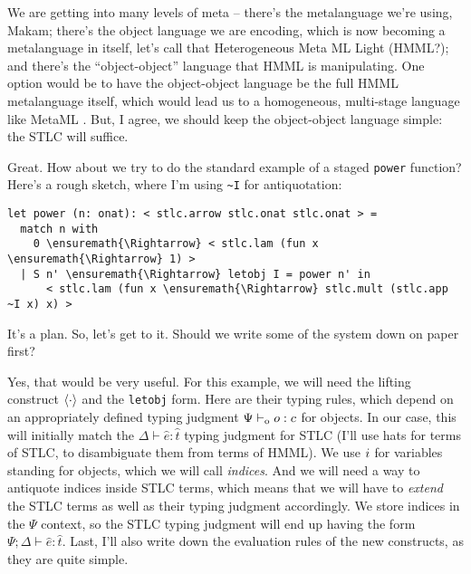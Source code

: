 \heroADVISOR{} We are getting into many levels of meta -- there's the
metalanguage we're using, Makam; there's the object language we are
encoding, which is now becoming a metalanguage in itself, let's call
that Heterogeneous Meta ML Light (HMML?); and there's the
``object-object'' language that HMML is manipulating. One option would
be to have the object-object language be the full HMML metalanguage
itself, which would lead us to a homogeneous, multi-stage language like
MetaML \citep{metaml-main-reference}. But, I agree, we should keep the
object-object language simple: the STLC will suffice.

\heroSTUDENT{} Great. How about we try to do the standard example of a staged
\texttt{power} function? Here's a rough sketch, where I'm using
\texttt{\textasciitilde{}I} for antiquotation:

\begin{verbatim}
let power (n: onat): < stlc.arrow stlc.onat stlc.onat > =
  match n with
    0 \ensuremath{\Rightarrow} < stlc.lam (fun x \ensuremath{\Rightarrow} 1) >
  | S n' \ensuremath{\Rightarrow} letobj I = power n' in
      < stlc.lam (fun x \ensuremath{\Rightarrow} stlc.mult (stlc.app ~I x) x) >
\end{verbatim}

\heroADVISOR{} It's a plan. So, let's get to it. Should we write some of the
system down on paper first?

\heroSTUDENT{} Yes, that would be very useful. For this example, we will need
the lifting construct \(\langle\cdot\rangle\) and the \texttt{letobj} form.
Here are their typing rules, which depend on an appropriately defined
typing judgment \(\Psi \vdash_{\text{o}} o : c\) for objects. In our case, this
will initially match the \(\Delta \vdash \hat{e} : \hat{t}\) typing
judgment for STLC (I'll use hats for terms of STLC, to disambiguate them
from terms of HMML). We use \(i\) for variables standing for
objects, which we will call \emph{indices}. And we will need a way to
antiquote indices inside STLC terms, which means that we will have to
\emph{extend} the STLC terms as well as their typing judgment
accordingly. We store indices in the \(\Psi\) context, so the STLC
typing judgment will end up having the form
\(\Psi; \Delta \vdash \hat{e} : \hat{t}\). Last, I'll also write down
the evaluation rules of the new constructs, as they are quite simple.

\newcommand\stlce[0]{\hat{e}}
\newcommand\stlct[0]{\hat{t}}
\newcommand\stlc[1]{\hat{#1}}

